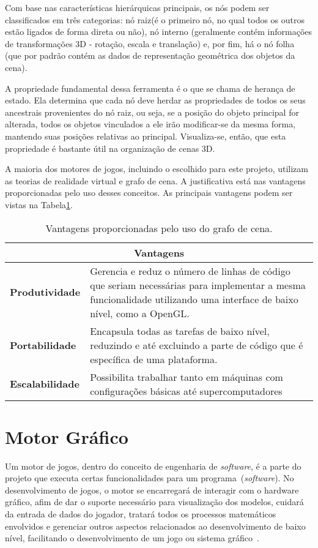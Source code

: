 	Com base nas características hierárquicas principais, os nós podem ser classificados em três categorias: nó raiz(é o primeiro nó, no qual todos os outros estão ligados de forma direta ou não), nó interno (geralmente contém informações de transformações 3D - rotação, escala e translação) e, por fim, há o nó folha (que por padrão contém as dados de representação geométrica dos objetos da cena).

	A propriedade fundamental dessa ferramenta é o que se chama de herança de estado. Ela determina que cada nó deve herdar as propriedades de todos os seus ancestrais provenientes do nó raiz, ou seja, se a posição do objeto principal for alterada, todos os objetos vinculados a ele irão modificar-se da mesma forma, mantendo suas posições relativas ao principal. Visualiza-se, então, que esta propriedade é bastante útil na organização de cenas 3D.

	A maioria dos motores de jogos, incluindo o escolhido para este projeto, utilizam as teorias de realidade virtual e grafo de cena. A justificativa está nas vantagens proporcionadas pelo uso desses conceitos. As principais vantagens podem ser vistas na Tabela\ref{tb:grafo_cena}.

\begin{table}
\centering
\caption{Vantagens proporcionadas pelo uso do grafo de cena.}
\begin{tabular}{|p{3cm}|p{8cm}|}
	\hline
	\multicolumn{2}{|c|}{\textbf{Vantagens}} \\ \hline
	\textbf{Produtividade} &  Gerencia e reduz o número de linhas de código que seriam necessárias para implementar
a mesma funcionalidade utilizando uma interface de baixo nível, como a OpenGL.\\ \hline
	\textbf{Portabilidade} &  Encapsula todas as tarefas de baixo nível, reduzindo e até 
excluindo a parte de código que é específica de uma plataforma.\\ \hline
	\textbf{Escalabilidade} &  Possibilita trabalhar tanto em máquinas com configurações básicas até supercomputadores\\ \hline
\end{tabular}
\label{tb:grafo_cena}
\end{table}

\section{Motor Gráfico}
	Um motor de jogos, dentro do conceito de engenharia de \textit{software}, é a parte do projeto que executa certas funcionalidades para um programa~(\textit{software}). No desenvolvimento de jogos, o motor se encarregará de interagir com o hardware gráfico, afim de dar o suporte necessário para visualização dos modelos, cuidará da entrada de dados do jogador, tratará todos os processos matemáticos envolvidos e gerenciar outros aspectos relacionados ao desenvolvimento de baixo nível, facilitando o desenvolvimento de um jogo ou sistema gráfico~\cite{engine}.

